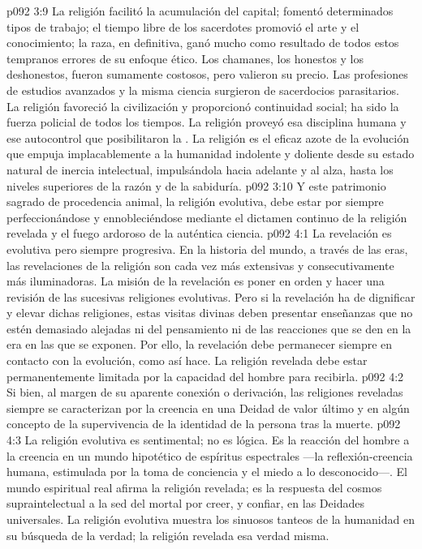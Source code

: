 \vs p092 3:9 \pc La religión facilitó la acumulación del capital; fomentó determinados tipos de trabajo; el tiempo libre de los sacerdotes promovió el arte y el conocimiento; la raza, en definitiva, ganó mucho como resultado de todos estos tempranos errores de su enfoque ético. Los chamanes, los honestos y los deshonestos, fueron sumamente costosos, pero valieron su precio. Las profesiones de estudios avanzados y la misma ciencia surgieron de sacerdocios parasitarios. La religión favoreció la civilización y proporcionó continuidad social; ha sido la fuerza policial de todos los tiempos. La religión proveyó esa disciplina humana y ese autocontrol que posibilitaron la . La religión es el eficaz azote de la evolución que empuja implacablemente a la humanidad indolente y doliente desde su estado natural de inercia intelectual, impulsándola hacia adelante y al alza, hasta los niveles superiores de la razón y de la sabiduría.
\vs p092 3:10 Y este patrimonio sagrado de procedencia animal, la religión evolutiva, debe estar por siempre perfeccionándose y ennobleciéndose mediante el dictamen continuo de la religión revelada y el fuego ardoroso de la auténtica ciencia.
\vs p092 4:1 La revelación es evolutiva pero siempre progresiva. En la historia del mundo, a través de las eras, las revelaciones de la religión son cada vez más extensivas y consecutivamente más iluminadoras. La misión de la revelación es poner en orden y hacer una revisión de las sucesivas religiones evolutivas. Pero si la revelación ha de dignificar y elevar dichas religiones, estas visitas divinas deben presentar enseñanzas que no estén demasiado alejadas ni del pensamiento ni de las reacciones que se den en la era en las que se exponen. Por ello, la revelación debe permanecer siempre en contacto con la evolución, como así hace. La religión revelada debe estar permanentemente limitada por la capacidad del hombre para recibirla.
\vs p092 4:2 Si bien, al margen de su aparente conexión o derivación, las religiones reveladas siempre se caracterizan por la creencia en una Deidad de valor último y en algún concepto de la supervivencia de la identidad de la persona tras la muerte.
\vs p092 4:3 La religión evolutiva es sentimental; no es lógica. Es la reacción del hombre a la creencia en un mundo hipotético de espíritus espectrales ---la reflexión\hyp{}creencia humana, estimulada por la toma de conciencia y el miedo a lo desconocido---. El mundo espiritual real afirma la religión revelada; es la respuesta del cosmos supraintelectual a la sed del mortal por creer, y confiar, en las Deidades universales. La religión evolutiva muestra los sinuosos tanteos de la humanidad en su búsqueda de la verdad; la religión revelada  esa verdad misma.
